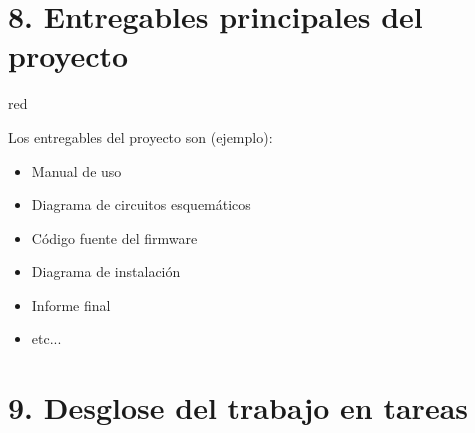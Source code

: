 \documentclass[11pt, %
codirector, %
]{charter}
\begin{document}
\section{8. Entregables principales del proyecto}
\label{sec:entregables}

\begin{consigna}{red}

Los entregables del proyecto son (ejemplo):

\begin{itemize}
	\item Manual de uso
	\item Diagrama de circuitos esquemáticos
	\item Código fuente del firmware
	\item Diagrama de instalación
	\item Informe final
	\item etc...
\end{itemize}

\end{consigna}

\section{9. Desglose del trabajo en tareas}
\label{sec:wbs}
\end{document}
